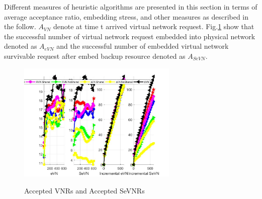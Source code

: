 Different measures \cite{fischer2013virtual} of heuristic algorithms are presented in this section in terms of average acceptance ratio, embedding stress, and other measures as described in the follow. $A_{VN}$ denote at time t arrived virtual network request. Fig.\ref{fig:VirNetReqSurNetReq} show that the successful number of virtual network request  embedded into physical network denoted as $A_{eVN}$ and the successful number of embedded virtual network survivable request after embed backup resource denoted as $A_{SeVN}$.

\begin{figure}
  \centering
  \includegraphics[width=3in]{Fig/VirNetReqSurNetReq}\\
  \caption{Accepted VNRs and Accepted SeVNRs}\label{fig:VirNetReqSurNetReq}
\end{figure}

